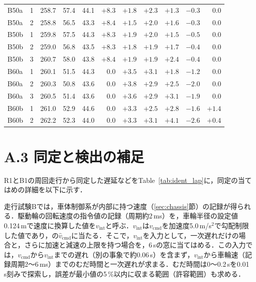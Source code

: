 \begin{table}[!htbp]
\begin{lrbox}{\tblbox}
\begin{tabular}{lrrrrrrrrrr}
    B50a & 1 & 258.7 & 57.4 & 44.1 & $+8.3$ & $+1.8$ & $+2.3$ & $+1.3$ & $-0.3$ & 0.0 \\
    B50a & 2 & 258.8 & 56.5 & 43.3 & $+8.4$ & $+1.5$ & $+2.0$ & $+1.6$ & $-0.3$ & 0.0 \\
    B50b & 1 & 259.8 & 57.5 & 44.3 & $+8.3$ & $+1.9$ & $+2.0$ & $+1.5$ & $-0.5$ & 0.0 \\
    B50b & 2 & 259.0 & 56.8 & 43.5 & $+8.3$ & $+1.8$ & $+1.9$ & $+1.7$ & $-0.4$ & 0.0 \\
    B50b & 3 & 260.7 & 58.0 & 43.8 & $+8.4$ & $+1.9$ & $+1.9$ & $+2.4$ & $-0.4$ & 0.0 \\
    B60a & 1 & 260.1 & 51.5 & 44.3 & 0.0 & $+3.5$ & $+3.1$ & $+1.8$ & $-1.2$ & 0.0 \\
    B60a & 2 & 260.3 & 50.8 & 43.6 & 0.0 & $+3.8$ & $+2.9$ & $+2.5$ & $-2.0$ & 0.0 \\
    B60a & 3 & 260.5 & 51.4 & 43.6 & 0.0 & $+3.6$ & $+2.9$ & $+3.1$ & $-1.9$ & 0.0 \\
    B60b & 1 & 261.0 & 52.9 & 44.6 & 0.0 & $+3.3$ & $+2.5$ & $+2.8$ & $-1.6$ & $+1.4$ \\
    B60b & 2 & 262.2 & 52.3 & 44.0 & 0.0 & $+3.3$ & $+3.1$ & $+4.1$ & $-2.6$ & $+0.4$ \\
    \bottomrule
  \end{tabular}\end{lrbox}\usebox{\tblbox}
\end{table}

\section*{A.3 同定と検出の補足}
\label{sec:app_ident}
R1とB1の周回走行から同定した遅延などをTable~\ref{tab:ident_lap}に，同定の当てはめの詳細を以下に示す．

走行試験Bでは，車体制御系が内部に持つ速度（\ref{sec:chassis}節）の記録が得られる．駆動輪の回転速度の指令値の記録（周期約2\,ms）を，車輪半径の設定値0.124\,mで速度に換算した値を$v_{\mathrm{int}}$と呼ぶ．$v_{\mathrm{int}}$は$v_{\mathrm{cmd}}$を加速度5.0\,m/s$^2$で勾配制限した値であり，の$\hat{v}_{\mathrm{cmd}}$に当たる．そこで，$v_{\mathrm{int}}$を入力として，一次遅れだけの場合と，さらに加速と減速の上限を持つ場合を，6\,sの窓に当てはめる．この入力では，$v_{\mathrm{cmd}}$から$v_{\mathrm{int}}$までの遅れ（別の事象で約0.06\,s）を含まず，$v_{\mathrm{int}}$から車輪速（記録周期2〜6\,ms）までのむだ時間と一次遅れが求まる．むだ時間は0〜0.2\,sを0.01\,s刻みで探索し，誤差が最小値の5\,\%以内に収まる範囲（許容範囲）も求める．


